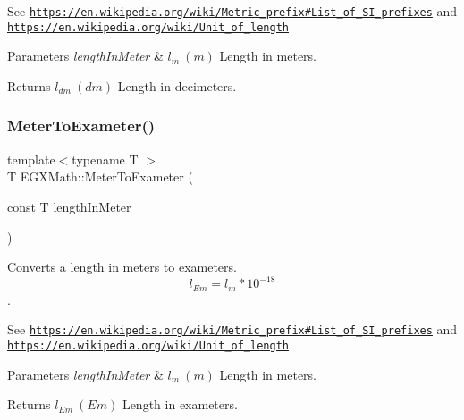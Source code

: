 See \href{https://en.wikipedia.org/wiki/Metric_prefix#List_of_SI_prefixes}{\tt https\+://en.\+wikipedia.\+org/wiki/\+Metric\+\_\+prefix\#\+List\+\_\+of\+\_\+\+S\+I\+\_\+prefixes} and \href{https://en.wikipedia.org/wiki/Unit_of_length}{\tt https\+://en.\+wikipedia.\+org/wiki/\+Unit\+\_\+of\+\_\+length} 
\begin{DoxyParams}{Parameters}
{\em length\+In\+Meter} & $ l_{m}\ (m)$ Length in meters. \\
\hline
\end{DoxyParams}
\begin{DoxyReturn}{Returns}
$ l_{dm}\ (dm)$ Length in decimeters. 
\end{DoxyReturn}
\mbox{\label{group___e_g_x_math-_conversions-_length_conversions-_s_i-_meter-_s_i_gadee48ed1b24c416ef0289dc4d803504b}} 
\subsubsection{\texorpdfstring{Meter\+To\+Exameter()}{MeterToExameter()}}
{\footnotesize\ttfamily template$<$typename T $>$ \\
T E\+G\+X\+Math\+::\+Meter\+To\+Exameter (\begin{DoxyParamCaption}\item[{const T}]{length\+In\+Meter }\end{DoxyParamCaption})}



Converts a length in meters to exameters. \[ l_{Em}=l_{m} * 10^{-18} \]. 

See \href{https://en.wikipedia.org/wiki/Metric_prefix#List_of_SI_prefixes}{\tt https\+://en.\+wikipedia.\+org/wiki/\+Metric\+\_\+prefix\#\+List\+\_\+of\+\_\+\+S\+I\+\_\+prefixes} and \href{https://en.wikipedia.org/wiki/Unit_of_length}{\tt https\+://en.\+wikipedia.\+org/wiki/\+Unit\+\_\+of\+\_\+length} 
\begin{DoxyParams}{Parameters}
{\em length\+In\+Meter} & $ l_{m}\ (m)$ Length in meters. \\
\hline
\end{DoxyParams}
\begin{DoxyReturn}{Returns}
$ l_{Em}\ (Em)$ Length in exameters. 
\end{DoxyReturn}
\mbox{\label{group___e_g_x_math-_conversions-_length_conversions-_s_i-_meter-_s_i_ga9fbb9437aa02f79a445e8c6177d0153e}} 
